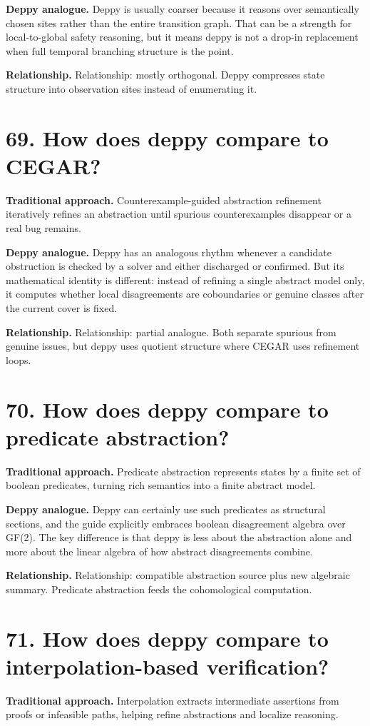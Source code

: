 \documentclass[11pt,openany]{book}
\begin{document}
\textbf{Deppy analogue.} Deppy is usually coarser because it reasons over semantically chosen sites rather than the entire transition graph. That can be a strength for local-to-global safety reasoning, but it means deppy is not a drop-in replacement when full temporal branching structure is the point.

\textbf{Relationship.} Relationship: mostly orthogonal. Deppy compresses state structure into observation sites instead of enumerating it.

\section*{69. How does deppy compare to CEGAR?}
\textbf{Traditional approach.} Counterexample-guided abstraction refinement iteratively refines an abstraction until spurious counterexamples disappear or a real bug remains.

\textbf{Deppy analogue.} Deppy has an analogous rhythm whenever a candidate obstruction is checked by a solver and either discharged or confirmed. But its mathematical identity is different: instead of refining a single abstract model only, it computes whether local disagreements are coboundaries or genuine classes after the current cover is fixed.

\textbf{Relationship.} Relationship: partial analogue. Both separate spurious from genuine issues, but deppy uses quotient structure where CEGAR uses refinement loops.

\section*{70. How does deppy compare to predicate abstraction?}
\textbf{Traditional approach.} Predicate abstraction represents states by a finite set of boolean predicates, turning rich semantics into a finite abstract model.

\textbf{Deppy analogue.} Deppy can certainly use such predicates as structural sections, and the guide explicitly embraces boolean disagreement algebra over GF(2). The key difference is that deppy is less about the abstraction alone and more about the linear algebra of how abstract disagreements combine.

\textbf{Relationship.} Relationship: compatible abstraction source plus new algebraic summary. Predicate abstraction feeds the cohomological computation.

\section*{71. How does deppy compare to interpolation-based verification?}
\textbf{Traditional approach.} Interpolation extracts intermediate assertions from proofs or infeasible paths, helping refine abstractions and localize reasoning.
\end{document}
